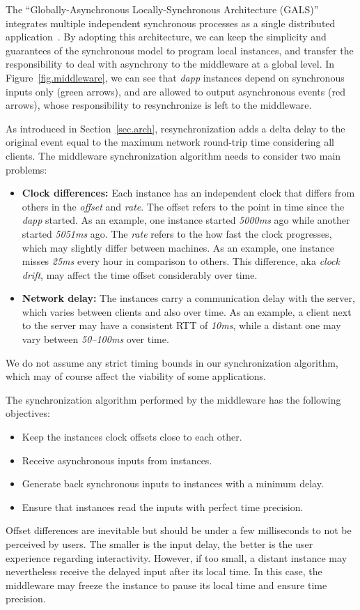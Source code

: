 \documentclass[sigplan,screen]{acmart}
\newcommand{\dapp}{\emph{dapp}\xspace}
\begin{document}
The ``Globally-Asynchronous Locally-Synchronous Architecture (GALS)''
integrates multiple independent synchronous processes as a single distributed
application~\cite{TODO}.
%
By adopting this architecture, we can keep the simplicity and guarantees of the
synchronous model to program local instances, and transfer the responsibility
to deal with asynchrony to the middleware at a global level.
%
In Figure~\ref{fig.middleware}, we can see that \dapp instances depend on
synchronous inputs only (green arrows), and are allowed to output asynchronous
events (red arrows), whose responsibility to resynchronize is left to the
middleware.

As introduced in Section~\ref{sec.arch}, resynchronization adds a delta delay
to the original event equal to the maximum network round-trip time considering
all clients.
The middleware synchronization algorithm needs to consider two main problems:
%
\begin{itemize}
\item \textbf{Clock differences:}
    Each instance has an independent clock that differs from others in the
    \emph{offset} and \emph{rate}.
    The offset refers to the point in time since the \dapp started.
    As an example, one instance started \emph{5000ms} ago while another started
    \emph{5051ms} ago.
    The \emph{rate} refers to the how fast the clock progresses, which may
    slightly differ between machines.
    As an example, one instance misses \emph{25ms} every hour in comparison to
    others.
    This difference, aka \emph{clock drift}, may affect the time offset
    considerably over time.
\item \textbf{Network delay:}
    The instances carry a communication delay with the server, which varies
    between clients and also over time.
    As an example, a client next to the server may have a consistent RTT of
    \emph{10ms}, while a distant one may vary between \emph{50--100ms} over
    time.
\end{itemize}
%
We do not assume any strict timing bounds in our synchronization algorithm,
which may of course affect the viability of some applications.

The synchronization algorithm performed by the middleware has the following
objectives:
%
\begin{itemize}
\item Keep the instances clock offsets close to each other.
\item Receive asynchronous inputs from instances.
\item Generate back synchronous inputs to instances with a minimum delay.
\item Ensure that instances read the inputs with perfect time precision.
\end{itemize}
%
Offset differences are inevitable but should be under a few milliseconds to not
be perceived by users.
The smaller is the input delay, the better is the user experience regarding
interactivity.
However, if too small, a distant instance may nevertheless receive the delayed
input after its local time.
In this case, the middleware may freeze the instance to pause its local time
and ensure time precision.
\end{document}
